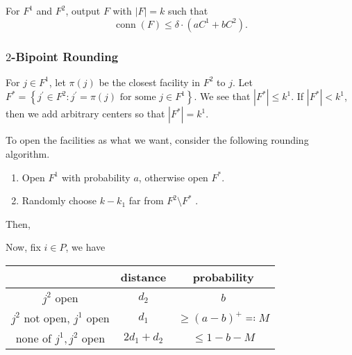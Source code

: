 \begin{remark}
	For \(F^1\) and \(F^2\), output \(F\) with \(\left\vert F \right\vert = k\) such that
	\[
		\mathop{\mathrm{conn}}(F) \leq \delta \cdot (a C^1 + b C^2).
	\]
\end{remark}

\subsubsection{\(2\)-Bipoint Rounding}
For \(j\in F^1\), let \(\pi (j)\)  be the closest facility in \(F^2\) to \(j\). Let \(F^{\ast} = \left\{ j^\prime \in F^2 \colon j^\prime =\pi (j) \text{ for some }j\in F^1  \right\} \). We see that \(\left\vert F^{\ast}  \right\vert \leq k^1\). If \(\left\vert F^{\ast}  \right\vert < k^1\), then we add arbitrary centers so that \(\left\vert F^{\ast}  \right\vert = k^1\).

To open the facilities as what we want, consider the following rounding algorithm.
\begin{enumerate}
	\item Open \(F^1\) with probability \(a\), otherwise open \(F^{\ast} \).
	\item Randomly choose \(k - k_1\) far from \(F^2 \setminus F^{\ast} \) .
\end{enumerate}

Then,

Now, fix \(i\in P\), we have
\begin{table}[H]
	\centering
	\begin{tabular}{c|c|c}
		\toprule
		                               & distance       & probability                  \\
		\midrule
		\(j^2\) open                   & \(d_2\)        & \(b\)                        \\
		\(j^2\) not open, \(j^1\) open & \(d_1\)        & \(\geq (a-b)^+ \eqqcolon M\) \\
		none of \(j^1, j^2\) open      & \(2d_1 + d_2\) & \(\leq 1 - b - M\)           \\
		\bottomrule
	\end{tabular}
\end{table}

